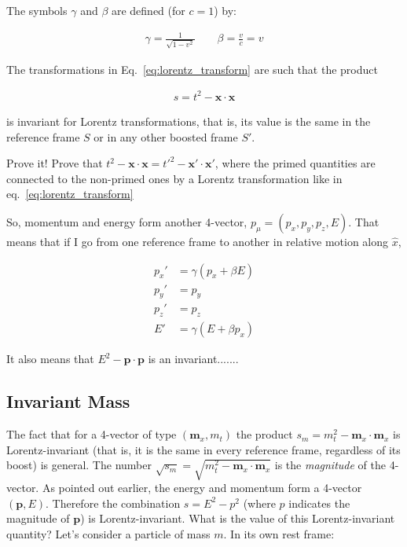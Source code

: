 The symbols $\gamma$ and $\beta$ are defined (for $c=1$) by: 

\begin{align}
\gamma = \frac{1}{\sqrt{1-v^2}} \qquad \beta = \frac{v}{c} = v
\end{align}

The transformations in Eq.~\ref{eq:lorentz_transform} are such that the product  

\begin{align}
s = t^2 - \mathbf{x} \cdot \mathbf{x}
\end{align}

\noindent is invariant for Lorentz transformations, that is, its value is the same in the reference frame $S$ or in any other boosted frame $S'$. 

\begin{exercise}
Prove it! Prove that  $t^2 - \mathbf{x} \cdot \mathbf{x} =  t'^2 - \mathbf{x'} \cdot \mathbf{x'}$, where the primed quantities are connected to the non-primed ones by a Lorentz transformation like in eq.~\ref{eq:lorentz_transform}
\end{exercise}

So, momentum and energy form another 4-vector, $p_{\mu} = (p_x,p_y,p_z,E)$. That means that if I go from one reference frame to another in relative motion along $\hat{x}$,

\begin{align}
p_x' &= \gamma \left(p_x + \beta E\right) \nonumber \\
p_y' &= p_y \nonumber \\
p_z' &= p_z \nonumber\\
E' &= \gamma \left(E + \beta p_x\right)
\end{align}
\label{eq:lorentz_transform_momentum}

It also means that $E^2 - \mathbf{p}\cdot \mathbf{p}$ is an invariant.......

\subsection{Invariant Mass}
\label{sec:invariant_mass}

The fact that for a 4-vector of type $\left(\mathbf{m}_x, m_t\right)$ the product $s_{m} = m_t^2 - \mathbf{m}_x \cdot \mathbf{m}_x$ is Lorentz-invariant (that is, it is the same in every reference frame, regardless of its boost) is general. The number $\sqrt{s_{m}} = \sqrt{m_t^2 - \mathbf{m}_x \cdot \mathbf{m}_x}$ is the \textit{magnitude} of the 4-vector. As pointed out earlier, the energy and momentum form a 4-vector $\left(\mathbf{p},E\right)$. Therefore the combination $s = E^2-p^2$ (where $p$ indicates the magnitude of $\mathbf{p}$) is Lorentz-invariant. What is the value of this Lorentz-invariant quantity? Let's consider a particle of mass $m$. In its own rest frame: 

